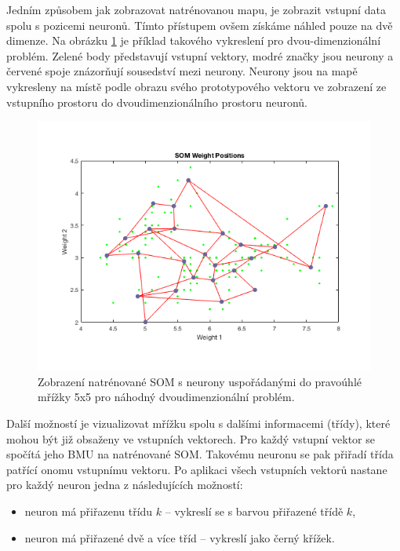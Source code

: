 \documentclass[thesis=M,czech]{FITthesis}[2012/06/26]
\begin{document}
Jedním způsobem jak zobrazovat natrénovanou mapu, je zobrazit vstupní data spolu s pozicemi neuronů. Tímto přístupem ovšem získáme náhled pouze na dvě dimenze. Na obrázku \ref{fig:plotsompos} je příklad takového vykreslení pro dvou-dimenzionální problém. Zelené body představují vstupní vektory, modré značky jsou neurony a červené spoje znázorňují sousedství mezi neurony. Neurony jsou na mapě vykresleny na místě podle obrazu svého prototypového vektoru ve zobrazení ze vstupního prostoru do dvoudimenzionálního prostoru neuronů.


\begin{figure}[htbp]
\begin{center}
	\includegraphics[scale=0.5]{iris_plotsompos.png}
\caption{Zobrazení natrénované SOM s neurony uspořádanými do pravoúhlé mřížky 5x5 pro náhodný dvoudimenzionální problém.}
\label{fig:plotsompos}
\end{center}
\end{figure}


Další možností je vizualizovat mřížku spolu s dalšími informacemi (třídy), které mohou být již obsaženy ve vstupních vektorech. Pro každý vstupní vektor se spočítá jeho BMU na natrénované SOM. Takovému neuronu se pak přiřadí třída patřící onomu vstupnímu vektoru. Po aplikaci všech vstupních vektorů nastane pro každý neuron jedna z následujících možností:

\begin{itemize}
\item neuron má přiřazenu třídu $k$ -- vykreslí se s barvou přiřazené třídě $k$,
\item  neuron má přiřazené dvě a více tříd -- vykreslí jako černý křížek.
\end{itemize}
 
\end{document}
